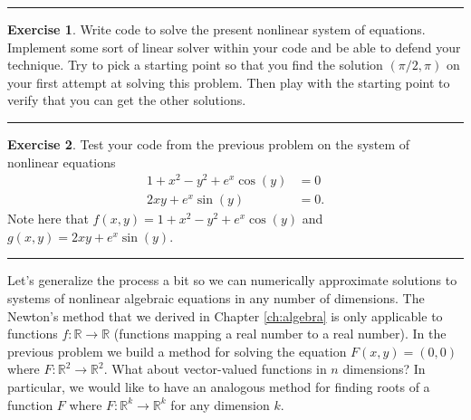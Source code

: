 \documentclass[
]{book}
\theoremstyle{definition}
\theoremstyle{definition}
\theoremstyle{definition}
\newtheorem{exercise}{Exercise}[chapter]
\theoremstyle{remark}
\begin{document}
\begin{center}\rule{0.5\linewidth}{0.5pt}\end{center}

\begin{exercise}
\protect\hypertarget{exr:unnamed-chunk-855}{}{\label{exr:unnamed-chunk-855} }Write code to solve the present nonlinear system of equations.
Implement some sort of linear solver within your code and be able to
defend your technique. Try to pick a starting point so that you
find the solution \((\pi/2,\pi)\) on your first attempt at solving
this problem. Then play with the starting point to verify that you
can get the other solutions.
\end{exercise}

\begin{center}\rule{0.5\linewidth}{0.5pt}\end{center}

\begin{exercise}
\protect\hypertarget{exr:unnamed-chunk-856}{}{\label{exr:unnamed-chunk-856} }Test your code from the previous problem on the system of nonlinear
equations \[\begin{aligned}
        1+x^2 - y^2 + e^x\cos(y) &= 0 \\
        2xy + e^x\sin(y) &=0.
    \end{aligned}\] Note here that \(f(x,y) = 1+x^2 - y^2 + e^x\cos(y)\)
and \(g(x,y) = 2xy + e^x \sin(y)\).
\end{exercise}

\begin{center}\rule{0.5\linewidth}{0.5pt}\end{center}

Let's
generalize the process a bit so we can numerically approximate solutions
to systems of nonlinear algebraic equations in any number of dimensions.
The Newton's method that we derived in Chapter \ref{ch:algebra} is only applicable to functions
\(f: \mathbb{R} \to \mathbb{R}\) (functions mapping a real number to a
real number). In the previous problem we build a method for solving the
equation \(F(x,y) = (0,0)\) where \(F: \mathbb{R}^2 \to \mathbb{R}^2\). What
about vector-valued functions in \(n\) dimensions? In particular, we would
like to have an analogous method for finding roots of a function \(F\)
where \(F: \mathbb{R}^k \to \mathbb{R}^k\) for any dimension \(k\).
\end{document}
